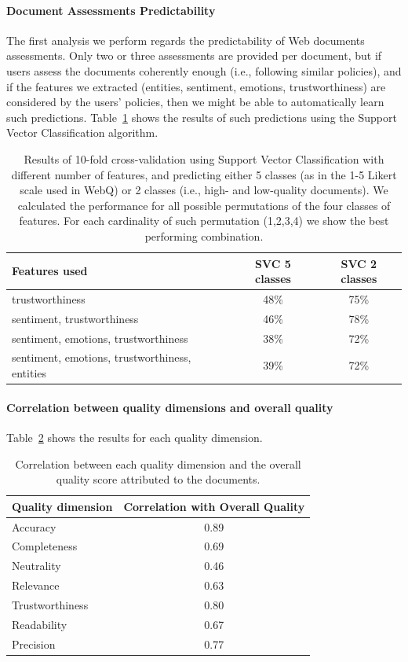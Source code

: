 \documentclass{llncs}
\begin{document}
\paragraph{Document Assessments Predictability}
The first analysis we perform regards the predictability of Web documents assessments. Only two or three assessments are provided per document, but if users assess the documents coherently enough (i.e., following similar policies), and if the features we extracted (entities, sentiment, emotions, trustworthiness) are considered by the users' policies, then we might be able to automatically learn such predictions.
Table~\ref{tab:predj} shows the results of such predictions using the Support Vector Classification algorithm.
\begin{table}
\centering
\caption{Results of 10-fold cross-validation using Support Vector Classification with different number of features, and predicting either 5 classes (as in the 1-5 Likert scale used in WebQ) or 2 classes (i.e., high- and low-quality documents). We calculated the performance for all possible permutations of the four classes of features. For each cardinality of such permutation (1,2,3,4) we show the best performing combination.\label{tab:predj}}
\begin{tabular}{|l|c|c|}
\hline
{\bf Features used} & {\bf SVC 5 classes} & {\bf SVC 2 classes}\\
\hline
trustworthiness & 48\% & 75\%\\
\hline
sentiment, trustworthiness & 46\% & 78\%\\
\hline
sentiment, emotions, trustworthiness & 38\% & 72\%\\
\hline
sentiment, emotions, trustworthiness, entities & 39\% & 72\%\\
\hline
\end{tabular}
\end{table}

\paragraph{Correlation between quality dimensions and overall quality}
Table~\ref{tab:corrj} shows the results for each quality dimension.
\begin{table}
\centering
\caption{Correlation between each quality dimension and the overall quality score attributed to the documents.\label{tab:corrj}}
\begin{tabular}{|l|c|}
\hline
{\bf Quality dimension} & {\bf Correlation with Overall Quality} \\
\hline
Accuracy         &      0.89\\ \hline
Completeness     &      0.69\\ \hline  
Neutrality       &      0.46\\ \hline  
Relevance        &      0.63\\ \hline  
Trustworthiness  &      0.80\\ \hline  
Readability      &      0.67\\ \hline 
Precision        &      0.77\\ \hline 
\end{tabular}

\end{table}
\end{document}
